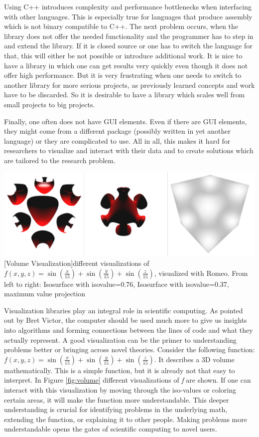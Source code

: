 Using C++ introduces complexity and performance bottlenecks when interfacing with other languages. This is especially true for languages that produce assembly which is not binary compatible to C++. 
The next problem occurs, when the library does not offer the needed functionality and the programmer has to step in and extend the library. 
If it is closed source or one has to switch the language for that, this will either be not possible or introduce additional work.
It is nice to have a library in which one can get results very quickly even though it does not offer high performance. 
But it is very frustrating when one needs to switch to another library for more serious projects, as previously learned concepts and work have to be discarded.
So it is desirable to have a library which scales well from small projects to big projects.

Finally, one often does not have GUI elements. 
Even if there are GUI elements, they might come from a different package (possibly written in yet another language) or they are complicated to use.
All in all, this makes it hard for researchers to visualize and interact with their data and to create solutions which are tailored to the research problem.

\vspace{1em}
\begin{minipage}{\linewidth}
    \centering
    \includegraphics[width=0.7\linewidth]{graphics/surfaces.png}
    [Volume Visualization]{different visualizations of $f(x,y,z)=\sin(\frac{x}{15})+\sin(\frac{y}{15})+\sin(\frac{z}{15})$, visualized with Romeo. From left to right: Isosurface with isovalue=0.76, Isosurface with isovalue=0.37, maximum value projection}
    \label{fig:volume}
\end{minipage}
\vspace{1em}

Visualization libraries play an integral role in scientific computing.
As pointed out by Bret Victor, the computer should be used much more to give us insights into algorithms and forming connections between the lines of code and what they actually represent\cite{BretVictorIventingOnPrinciple}.
A good visualization can be the primer to understanding problems better or bringing across novel theories.
Consider the following function: $f(x,y,z)=\sin(\frac{x}{15})+\sin(\frac{y}{15})+\sin(\frac{z}{15})$. 
It describes a 3D volume mathematically. 
This is a simple function, but it is already not that easy to interpret. In Figure \ref{fig:volume} different visualizations of \textit{f} are shown.
If one can interact with this visualization by moving through the iso-values or coloring certain areas, it will make the function more understandable.
This deeper understanding is crucial for identifying problems in the underlying math, extending the function, or explaining it to other people. 
Making problems more understandable opens the gates of scientific computing to novel users.

